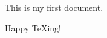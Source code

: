 \documentclass{article}
\begin{document}
This is my first document.

Happy \TeX ing!
\end{document}
